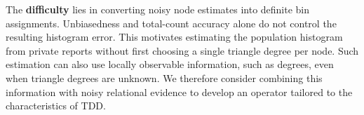 The \textbf{difficulty} lies in converting noisy node estimates into definite bin assignments. 
Unbiasedness and total-count accuracy alone do not control the resulting histogram error.
This motivates estimating the population histogram from private reports without first choosing a single triangle degree per node.
Such estimation can also use locally observable information, such as degrees, even when triangle degrees are unknown.
We therefore consider combining this information with noisy relational evidence to develop an operator tailored to the characteristics of TDD.

